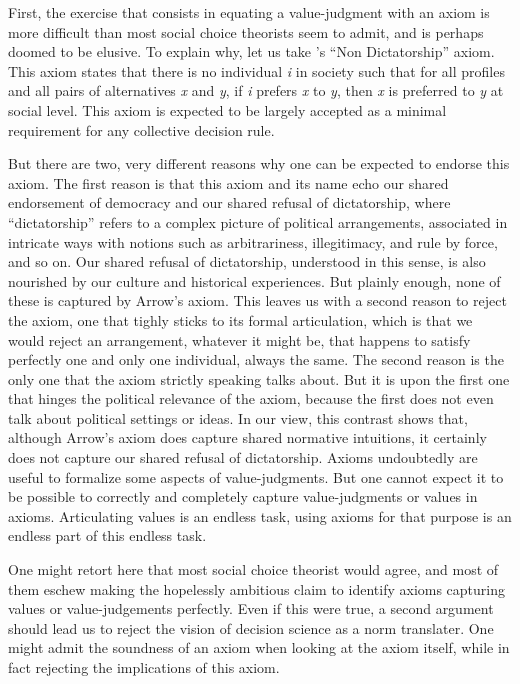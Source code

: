 \documentclass[preprint,11pt]{elsarticle}
\begin{document}
First, the exercise that consists in equating a value-judgment with an axiom is more difficult than most social choice theorists seem to admit, and is perhaps doomed to be elusive. To explain why, let us take \cite{arrow_social_2012}'s “Non Dictatorship” axiom. This axiom states that there is no individual \emph{i} in society such that for all profiles and all pairs of alternatives \emph{x} and \emph{y}, if \emph{i} prefers \emph{x} to \emph{y}, then \emph{x} is preferred to \emph{y} at social level. This axiom is expected to be largely accepted as a minimal requirement for any collective decision rule.

But there are two, very different reasons why one can be expected to endorse this axiom. The first reason is that this axiom and its name echo our shared endorsement of democracy and our shared refusal of dictatorship, where ``dictatorship'' refers to a complex picture of political arrangements, associated in intricate ways with notions such as arbitrariness, illegitimacy, and rule by force, and so on. Our shared refusal of dictatorship, understood in this sense, is also nourished by our culture and historical experiences. But plainly enough, none of these is captured by Arrow's axiom. This leaves us with a second reason to reject the axiom, one that tighly sticks to its formal articulation, which is that we would reject an arrangement, whatever it might be, that happens to satisfy perfectly one and only one individual, always the same. The second reason is the only one that the axiom strictly speaking talks about. But it is upon the first one that hinges the political relevance of the axiom, because the first does not even talk about political settings or ideas. In our view, this contrast shows that, although Arrow's axiom does capture shared normative intuitions, it certainly does not capture our shared refusal of dictatorship. Axioms undoubtedly are useful to formalize some aspects of value-judgments. But one cannot expect it to be possible to correctly and completely capture value-judgments or values in axioms. Articulating values is an endless task, using axioms for that purpose is an endless part of this endless task.

One might retort here that most social choice theorist would agree, and most of them eschew making the hopelessly ambitious claim to identify axioms capturing values or value-judgements perfectly. Even if this were true, a second argument should lead us to reject the vision of decision science as a norm translater. One might admit the soundness of an axiom when looking at the axiom itself, while in fact rejecting the implications of this axiom.
\end{document}
